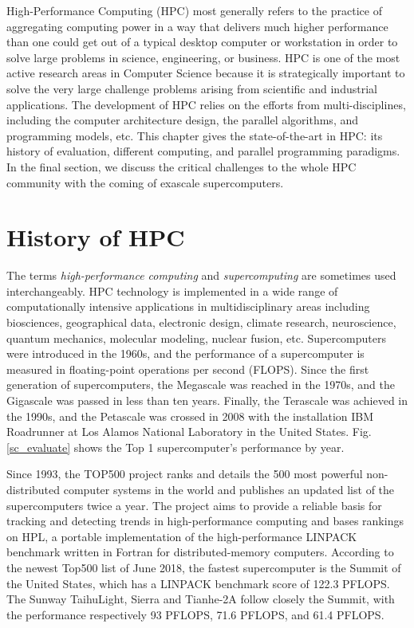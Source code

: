 \begin{displayquote}
	\textsf{High-Performance Computing (HPC) most generally refers to the practice of aggregating computing power in a way that delivers much higher performance than one could get out of a typical desktop computer or workstation in order to solve large problems in science, engineering, or business. HPC is one of the most active research areas in Computer Science because it is strategically important to solve the very large challenge problems arising from scientific and industrial applications. The development of HPC relies on the efforts from multi-disciplines, including the computer architecture design, the parallel algorithms, and programming models, etc. This chapter gives the state-of-the-art in HPC: its history of evaluation, different computing, and parallel programming paradigms. In the final section, we discuss the critical challenges to the whole HPC community with the coming of exascale supercomputers.}
\end{displayquote}

\vspace{1in}

\section{History of HPC}

The terms \textit{high-performance computing} and \textit{supercomputing} are sometimes used interchangeably. HPC technology is implemented in a wide range of computationally intensive applications in multidisciplinary areas including biosciences, geographical data, electronic design, climate research, neuroscience, quantum mechanics, molecular modeling, nuclear fusion, etc. Supercomputers were introduced in the 1960s, and the performance of a supercomputer is measured in floating-point operations per second (FLOPS). Since the first generation of supercomputers, the Megascale was reached in the 1970s, and the Gigascale was passed in less than ten years. Finally, the Terascale was achieved in the 1990s, and the Petascale was crossed in 2008 with the installation IBM Roadrunner at Los Alamos National Laboratory in the United States. Fig. \ref{sc_evaluate} shows the Top 1 supercomputer's performance by year.

Since 1993, the TOP500 project ranks and details the 500 most powerful non-distributed computer systems in the world and publishes an updated list of the supercomputers twice a year. The project aims to provide a reliable basis for tracking and detecting trends in high-performance computing and bases rankings on HPL, a portable implementation of the high-performance LINPACK benchmark written in Fortran for distributed-memory computers. According to the newest Top500 list of June 2018, the fastest supercomputer is the Summit of the United States, which has a LINPACK benchmark score of 122.3 PFLOPS. The Sunway TaihuLight, Sierra and Tianhe-2A follow closely the Summit, with the performance respectively 93 PFLOPS, 71.6 PFLOPS, and 61.4 PFLOPS. 

